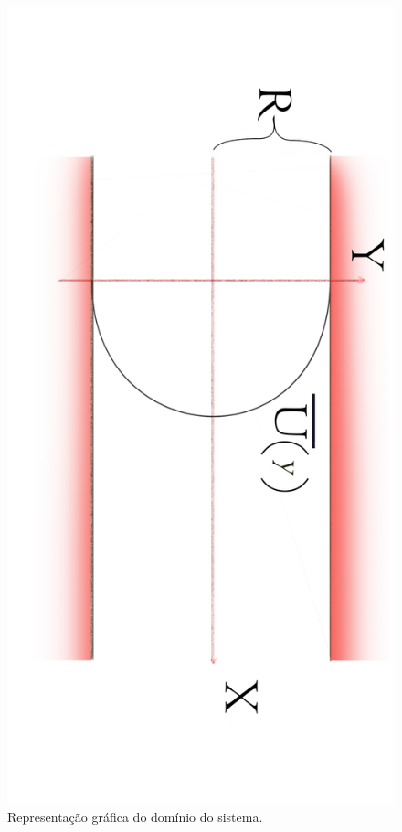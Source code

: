 \documentclass[xcolor=dvipsnames,10pt,aspectratio=169]{beamer}
\begin{document}
\begin{frame}
\begin{minipage}[h!]{0.45\textwidth}
\begin{figure}
				\includegraphics[angle=90, scale=0.06]{canalvermelho}
				\caption{Representação gráfica do domínio do sistema.}
				\label{sistema}
			\end{figure}
			\end{minipage}\\
		\end{frame}
	
\end{document}
